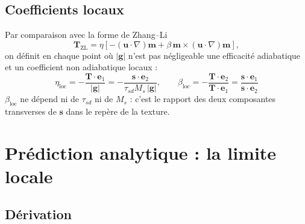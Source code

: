\documentclass[11pt,a4paper]{article}
\newcommand{\vm}{\bm{m}}
\newcommand{\vs}{\bm{s}}
\newcommand{\vu}{\bm{u}}
\newcommand{\vg}{\bm{g}}
\newcommand{\vT}{\bm{T}}
\newcommand{\ve}{\bm{e}}
\begin{document}
\subsection{Coefficients locaux}

Par comparaison avec la forme de Zhang--Li
\begin{equation}
  \vT_{\text{ZL}} = \eta\left[-(\vu\cdot\nabla)\vm + \beta\,\vm\times(\vu\cdot\nabla)\vm\right],
  \label{eq:ZL}
\end{equation}
on définit en chaque point où $|\vg|$ n'est pas négligeable une efficacité adiabatique et un
coefficient non adiabatique locaux :
\begin{equation}
  \boxed{\;
  \eta_{\text{loc}} = -\frac{\vT\cdot\ve_1}{|\vg|} = -\frac{\vs\cdot\ve_2}{\tau_{sd}M_s\,|\vg|},
  \qquad
  \beta_{\text{loc}} = -\frac{\vT\cdot\ve_2}{\vT\cdot\ve_1} = \frac{\vs\cdot\ve_1}{\vs\cdot\ve_2}
  \;}
  \label{eq:coefs}
\end{equation}
$\beta_{\text{loc}}$ ne dépend ni de $\tau_{sd}$ ni de $M_s$ : c'est le rapport des deux
composantes transverses de $\vs$ dans le repère de la texture.

\section{Prédiction analytique : la limite locale}
\label{sec:local}

\subsection{Dérivation}
\end{document}
